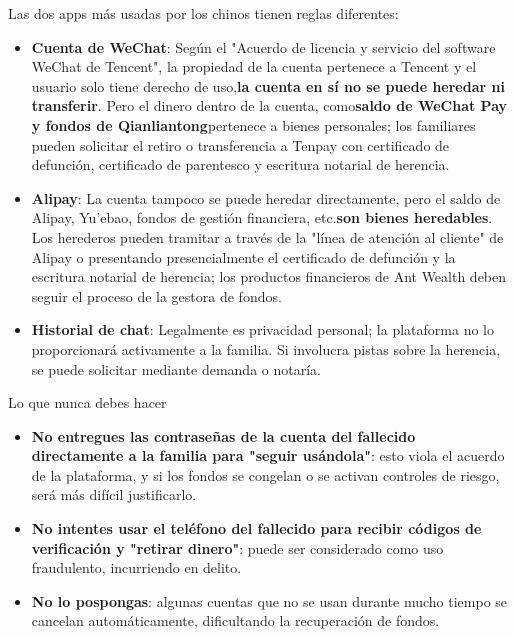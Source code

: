 
Las dos apps más usadas por los chinos tienen reglas diferentes:

\begin{itemize}
  \item \textbf{Cuenta de WeChat}: Según el "Acuerdo de licencia y servicio del software WeChat de Tencent", la propiedad de la cuenta pertenece a Tencent y el usuario solo tiene derecho de uso,\textbf{la cuenta en sí no se puede heredar ni transferir}. Pero el dinero dentro de la cuenta, como\textbf{saldo de WeChat Pay y fondos de Qianliantong}pertenece a bienes personales; los familiares pueden solicitar el retiro o transferencia a Tenpay con certificado de defunción, certificado de parentesco y escritura notarial de herencia.
  \item \textbf{Alipay}: La cuenta tampoco se puede heredar directamente, pero el saldo de Alipay, Yu'ebao, fondos de gestión financiera, etc.\textbf{son bienes heredables}. Los herederos pueden tramitar a través de la "línea de atención al cliente" de Alipay o presentando presencialmente el certificado de defunción y la escritura notarial de herencia; los productos financieros de Ant Wealth deben seguir el proceso de la gestora de fondos.
  \item \textbf{Historial de chat}: Legalmente es privacidad personal; la plataforma no lo proporcionará activamente a la familia. Si involucra pistas sobre la herencia, se puede solicitar mediante demanda o notaría.
\end{itemize}

\begin{tcbwarn}{Lo que nunca debes hacer}
\begin{itemize}
  \item \textbf{No entregues las contraseñas de la cuenta del fallecido directamente a la familia para "seguir usándola"}: esto viola el acuerdo de la plataforma, y si los fondos se congelan o se activan controles de riesgo, será más difícil justificarlo.
  \item \textbf{No intentes usar el teléfono del fallecido para recibir códigos de verificación y "retirar dinero"}: puede ser considerado como uso fraudulento, incurriendo en delito.
  \item \textbf{No lo pospongas}: algunas cuentas que no se usan durante mucho tiempo se cancelan automáticamente, dificultando la recuperación de fondos.
\end{itemize}

\end{tcbwarn}

